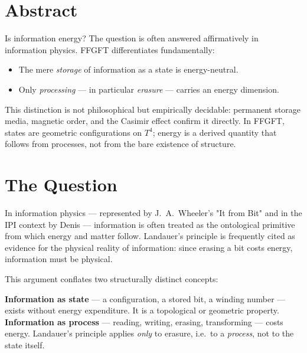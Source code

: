 
\section*{Abstract}

Is information energy? The question is often answered affirmatively in
information physics. FFGFT differentiates fundamentally:

\begin{itemize}
  \item The mere \emph{storage} of information as a state is energy-neutral.
  \item Only \emph{processing} — in particular \emph{erasure} — carries an
        energy dimension.
\end{itemize}

This distinction is not philosophical but empirically decidable: permanent
storage media, magnetic order, and the Casimir effect confirm it directly.
In FFGFT, states are geometric configurations on $T^4$; energy is a derived
quantity that follows from processes, not from the bare existence of structure.

\section{The Question}

In information physics — represented by J.~A.~Wheeler's "It from Bit"
\cite{Wheeler1990} and in the IPI context by Denis \cite{Denis2023} —
information is often treated as the ontological primitive from which
energy and matter follow. Landauer's principle \cite{Landauer1961} is
frequently cited as evidence for the physical reality of information:
since erasing a bit costs energy, information must be physical.

This argument conflates two structurally distinct concepts:

\begin{keyresult}
\textbf{Information as state} — a configuration, a stored bit, a winding
number — exists without energy expenditure. It is a topological or geometric
property.\\
\textbf{Information as process} — reading, writing, erasing, transforming
— costs energy. Landauer's principle applies \emph{only} to erasure, i.e.\
to a \emph{process}, not to the state itself.
\end{keyresult}

